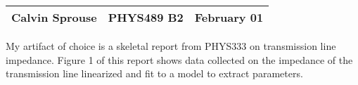 \documentclass[a4paper, 12pt]{config/homework}
\begin{document}
\noindent
\begin{tabularx}{\textwidth}{>{\centering\arraybackslash}X>{\centering\arraybackslash}X>{\centering\arraybackslash}X}
Calvin Sprouse & PHYS489 B2 & 2024 February 01\\
\midrule
\end{tabularx}

My artifact of choice is a skeletal report from PHYS333 on transmission line impedance. Figure 1 of this report shows data collected on the impedance of the transmission line linearized and fit to a model to extract parameters. 


\end{document}
